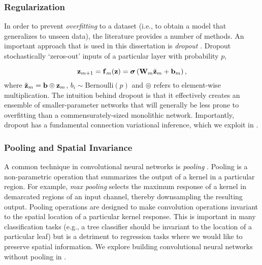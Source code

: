 \subsubsection{Regularization}

In order to prevent \textit{overfitting} to a dataset (i.e., to obtain a model that generalizes to unseen data), the literature provides a number of methods. An important approach that is used in this dissertation is \textit{dropout} \citep{srivastava_dropout_2014}. Dropout stochastically `zeros-out' inputs of a particular layer with probability $p$, 

\begin{equation}
	\boldsymbol{\mathbf{z}}_{m+1} = \boldsymbol{\mathbf{f}}_m(\boldsymbol{\mathbf{z}}) = \boldsymbol{\mathbf{\sigma}}\left(\boldsymbol{\mathbf{W}}_m\tilde{\boldsymbol{\mathbf{z}}}_m + \boldsymbol{\mathbf{b}}_m\right),
\end{equation}
where $\tilde{\boldsymbol{\mathbf{z}}}_m = \boldsymbol{\mathbf{b}} \circledcirc \boldsymbol{\mathbf{z}}_m$, $b_i \sim \text{Bernoulli}(p)$ and $\circledcirc$ refers to element-wise multiplication.
The intuition behind dropout is that it effectively creates an ensemble of smaller-parameter networks that will generally be less prone to overfitting than a commensurately-sized monolithic network. Importantly, dropout has a fundamental connection variational inference, which we exploit in .
\subsubsection{Pooling and Spatial Invariance}
A common technique in convolutional neural networks is \textit{pooling} \citep{Goodfellow-et-al-2016}. Pooling is a non-parametric operation that summarizes the output of a kernel in a particular region. For example, \textit{max pooling} selects the maximum response of a kernel in demarcated regions of an input channel, thereby downsampling the resulting output. Pooling operations are designed to make convolution operations invariant to the spatial location of a particular kernel response. This is important in many classification tasks (e.g., a tree classifier should be invariant to the location of a particular leaf) but is a detriment to regression tasks where we would like to preserve spatial information. We explore building convolutional neural networks without pooling in .



 